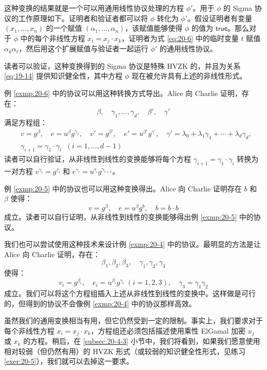 这种变换的结果就是一个可以用通用线性协议处理的方程 $\phi'$。用于 $\phi$ 的 Sigma 协议的工作原理如下。证明者和验证者都可以将 $\phi$ 转化为 $\phi'$。假设证明者有变量 $(x_1,\dots,x_n)$ 的一个赋值 $(\alpha_1,\dots,\alpha_n)$，该赋值能够使得 $\phi$ 的值为 $\mathsf{true}$。那么对于 $\phi$ 中的每个非线性方程 $x_i=x_j\cdot x_k$，证明者为式 \ref{eq:20-6} 中的临时变量 $t$ 赋值 $\alpha_k\alpha_\ell$，然后用这个扩展赋值与验证者一起运行 $\phi'$ 的通用线性协议。

读者可以验证，这种变换得到的 Sigma 协议是特殊 HVZK 的，并且为关系 \ref{eq:19-14} 提供知识健全性，其中方程 $\phi$ 现在被允许具有上述的非线性形式。

\begin{snote}[多项式计算.]
例 \ref{exmp:20-6} 中的协议可以用这种转换方式导出。Alice 向 Charlie 证明，存在：
\[
\beta,
\quad
\gamma_1,\dots,\gamma_d,
\quad
\beta',
\quad
\gamma'
\]
满足方程组：
\begin{equation*}
\begin{aligned}
& v=g^\beta,
\quad
e=u^\beta g^{\gamma_1},
\quad
v'=g^{\beta'},
\quad
e'=u^{\beta'}g^{\gamma'},
\quad
\gamma'=\lambda_0+\lambda_1\gamma_1+\cdots+\lambda_d\gamma_d,\\
& \gamma_{i+1}=\gamma_1\cdot\gamma_i\;\;(i=1,\dots,d-1)
\end{aligned}
\end{equation*}
读者可以自行验证，从非线性到线性的变换能够将每个方程 $\gamma_{i+1}=\gamma_1\cdot\gamma_i$ 转换为一对方程 $v^{\gamma_i}=g^{\tau_i}$ 和 $e^{\gamma_i}=u^{\tau_i}g^{\gamma_{i+1}}$。
\end{snote}

\begin{snote}[加密后的比特.]
例 \ref{exmp:20-5} 中的协议也可以用这种变换得出。Alice 向 Charlie 证明存在 $b$ 和 $\beta$ 使得：
\[
v=g^\beta,
\quad
e=u^\beta g^b,
\quad
b=b\cdot b
\]
成立。读者可以自行证明，从非线性到线性的变换能够得出例 \ref{exmp:20-5} 中的协议。
\end{snote}

\begin{snote}
我们也可以尝试使用这种技术来设计例 \ref{exmp:20-4} 中的协议。最明显的方法是让 Alice 向 Charlie 证明，存在：
\[
\beta_1,\beta_2,\beta_3,
\quad
\gamma_1,\gamma_2,\gamma_3
\]
使得：
\[
v_i=g^{\beta_i},
\quad
e_i=u^{\beta_i}g^{\gamma_i}\;(i=1,2,3),
\quad
\gamma_3=\gamma_1\gamma_2
\]
成立。我们可以将这个方程组插入上述从非线性到线性的变换中。这样做是可行的，但得到的协议不会像例 \ref{exmp:20-4} 中的协议那样高效。
\end{snote}

\begin{snote}[去除对非线性方程的约束.]
虽然我们的通用变换相当有用，但它仍然受到一定的限制。事实上，我们要求对于每个非线性方程 $x_i=x_j\cdot x_k$，方程组还必须包括描述使用乘性 ElGamal 加密 $x_j$ 或 $x_k$ 的方程。稍后，在 \ref{subsec:20-4-3} 小节中，我们将看到，如果我们愿意使用相对较弱（但仍然有用）的 HVZK 形式（或较弱的知识健全性形式，见练习 \ref{exer:20-5}），我们就可以去掉这一要求。
\end{snote}